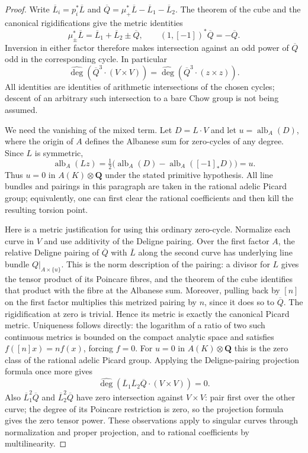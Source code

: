 \begin{proof}
Write $\overline L_i=p_i^*\overline L$ and
$\overline Q=\mu_+^*\overline L-\overline L_1-\overline L_2$.
The theorem of the cube and the canonical rigidifications give the
metric identities
\[
 \mu_\pm^*\overline L=\overline L_1+\overline L_2\pm\overline Q,
 \qquad (1,[-1])^*\overline Q=-\overline Q.
\]
Inversion in either factor therefore makes intersection against an odd
power of $\overline Q$ odd in the corresponding cycle. In particular
\[
 \widehat{\deg}(\overline Q^3\cdot(V\times V))
 =\widehat{\deg}(\overline Q^3\cdot(z\times z)).             \tag{AR.35}
\]
All identities are identities of arithmetic intersections of the chosen
cycles; descent of an arbitrary such intersection to a bare Chow group
is not being assumed.

We need the vanishing of the mixed term. Let $D=L\cdot V$ and let
$u=\operatorname{alb}_A(D)$, where the origin of $A$ defines the
Albanese sum for zero-cycles of any degree. Since $L$ is symmetric,
\[
 \operatorname{alb}_A(Lz)
 =\tfrac12\bigl(\operatorname{alb}_A(D)
                    -\operatorname{alb}_A([-1]_*D)\bigr)=u.
\]
Thus $u=0$ in $A(K)\otimes\mathbf Q$ under the stated primitive
hypothesis. All line bundles and pairings in this paragraph are taken
in the rational adelic Picard group; equivalently, one can first clear
the rational coefficients and then kill the resulting torsion point.

Here is a metric justification for using this ordinary zero-cycle.
Normalize each curve in $V$ and use additivity of the Deligne pairing.
Over the first factor $A$, the relative Deligne pairing of
$\overline Q$ with $\overline L$ along the second curve has underlying
line bundle $Q|_{A\times\{u\}}$. This is the norm description of the
pairing: a divisor for $L$ gives the tensor product of its Poincare
fibres, and the theorem of the cube identifies that product with the
fibre at the Albanese sum. Moreover, pulling back by $[n]$ on the first
factor multiplies this metrized pairing by $n$, since it does so to
$\overline Q$. The rigidification at zero is trivial. Hence its metric
is exactly the canonical Picard metric. Uniqueness follows directly:
the logarithm of a ratio of two such continuous metrics is bounded on
the compact analytic space and satisfies $f([n]x)=n f(x)$, forcing
$f=0$. For $u=0$ in $A(K)\otimes\mathbf Q$ this is the zero class
of the rational adelic Picard group. Applying the
Deligne-pairing projection formula once more gives
\[
 \widehat{\deg}(\overline L_1\overline L_2\overline Q
                   \cdot(V\times V))=0.                   \tag{AR.36}
\]
Also $\overline L_1^2\overline Q$ and
$\overline L_2^2\overline Q$ have zero intersection against
$V\times V$: pair first over the other curve; the degree of its
Poincare restriction is zero, so the projection formula gives the
zero tensor power. These observations apply to singular curves through
normalization and proper projection, and to rational coefficients by
multilinearity.


\end{proof}
